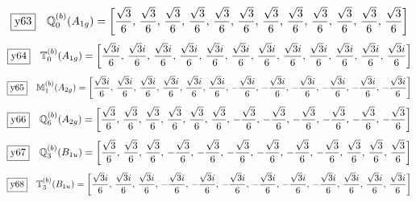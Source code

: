 \documentclass[fleqn,10pt,landscape]{jsarticle}
\begin{document}
\begin{dmath*}
\fbox{y63}\quad \mathbb{Q}_{0}^{(b)}(A_{1g})=\left[ \frac{\sqrt{3}}{6},\, \frac{\sqrt{3}}{6},\, \frac{\sqrt{3}}{6},\, \frac{\sqrt{3}}{6},\, \frac{\sqrt{3}}{6},\, \frac{\sqrt{3}}{6},\, \frac{\sqrt{3}}{6},\, \frac{\sqrt{3}}{6},\, \frac{\sqrt{3}}{6},\, \frac{\sqrt{3}}{6},\, \frac{\sqrt{3}}{6},\, \frac{\sqrt{3}}{6} \right]
\end{dmath*}
\begin{dmath*}
\fbox{y64}\quad \mathbb{T}_{0}^{(b)}(A_{1g})=\left[ \frac{\sqrt{3} i}{6},\, \frac{\sqrt{3} i}{6},\, \frac{\sqrt{3} i}{6},\, \frac{\sqrt{3} i}{6},\, \frac{\sqrt{3} i}{6},\, \frac{\sqrt{3} i}{6},\, \frac{\sqrt{3} i}{6},\, \frac{\sqrt{3} i}{6},\, \frac{\sqrt{3} i}{6},\, \frac{\sqrt{3} i}{6},\, \frac{\sqrt{3} i}{6},\, \frac{\sqrt{3} i}{6} \right]
\end{dmath*}
\begin{dmath*}
\fbox{y65}\quad \mathbb{M}_{1}^{(b)}(A_{2g})=\left[ \frac{\sqrt{3} i}{6},\, \frac{\sqrt{3} i}{6},\, \frac{\sqrt{3} i}{6},\, \frac{\sqrt{3} i}{6},\, \frac{\sqrt{3} i}{6},\, \frac{\sqrt{3} i}{6},\, - \frac{\sqrt{3} i}{6},\, - \frac{\sqrt{3} i}{6},\, - \frac{\sqrt{3} i}{6},\, - \frac{\sqrt{3} i}{6},\, - \frac{\sqrt{3} i}{6},\, - \frac{\sqrt{3} i}{6} \right]
\end{dmath*}
\begin{dmath*}
\fbox{y66}\quad \mathbb{Q}_{6}^{(b)}(A_{2g})=\left[ \frac{\sqrt{3}}{6},\, \frac{\sqrt{3}}{6},\, \frac{\sqrt{3}}{6},\, \frac{\sqrt{3}}{6},\, \frac{\sqrt{3}}{6},\, \frac{\sqrt{3}}{6},\, - \frac{\sqrt{3}}{6},\, - \frac{\sqrt{3}}{6},\, - \frac{\sqrt{3}}{6},\, - \frac{\sqrt{3}}{6},\, - \frac{\sqrt{3}}{6},\, - \frac{\sqrt{3}}{6} \right]
\end{dmath*}
\begin{dmath*}
\fbox{y67}\quad \mathbb{Q}_{3}^{(b)}(B_{1u})=\left[ \frac{\sqrt{3}}{6},\, \frac{\sqrt{3}}{6},\, \frac{\sqrt{3}}{6},\, - \frac{\sqrt{3}}{6},\, - \frac{\sqrt{3}}{6},\, - \frac{\sqrt{3}}{6},\, - \frac{\sqrt{3}}{6},\, - \frac{\sqrt{3}}{6},\, - \frac{\sqrt{3}}{6},\, \frac{\sqrt{3}}{6},\, \frac{\sqrt{3}}{6},\, \frac{\sqrt{3}}{6} \right]
\end{dmath*}
\begin{dmath*}
\fbox{y68}\quad \mathbb{T}_{3}^{(b)}(B_{1u})=\left[ \frac{\sqrt{3} i}{6},\, \frac{\sqrt{3} i}{6},\, \frac{\sqrt{3} i}{6},\, - \frac{\sqrt{3} i}{6},\, - \frac{\sqrt{3} i}{6},\, - \frac{\sqrt{3} i}{6},\, - \frac{\sqrt{3} i}{6},\, - \frac{\sqrt{3} i}{6},\, - \frac{\sqrt{3} i}{6},\, \frac{\sqrt{3} i}{6},\, \frac{\sqrt{3} i}{6},\, \frac{\sqrt{3} i}{6} \right]
\end{dmath*}
\end{document}
